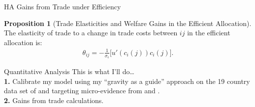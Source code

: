 \documentclass[9pt,pdftex,aspectratio=1610]{beamer}
\theoremstyle{definition}
\newtheorem{prp}{Proposition}
\begin{document}
\begin{frame}[t]{HA Gains from Trade under Efficiency}
\vspace{-.25cm}
\smallskip
{\small
\begin{prp}[{\normalsize Trade Elasticities and Welfare Gains in the Efficient Allocation}]\label{prp:gains-efficient-allocation} The elasticity of trade to a change in trade costs between $ij$ in the efficient allocation is:
\begin{align*}
\theta_{ij} =  -\frac{1}{\sigma_{\epsilon}} \bigg [ u'(c_{i}(j)) c_{i}(j) \bigg].
\end{align*}
 
\end{prp}
}
\medskip
{}


\end{frame}


\begin{frame}[t]{Quantitative Analysis}
\smallskip
\smallskip
This is what I'll do\ldots\\
\bigskip
\textbf{1.} Calibrate my model using my ``gravity as a guide'' approach on the 19 country data set of \citet{eaton2002technology} and targeting micro-evidence from \citet{borusyak2021distributional} and \citet{auer2022unequal}. \\
\bigskip
\textbf{2.} Gains from trade calculations.\\
\end{frame}
\end{document}
